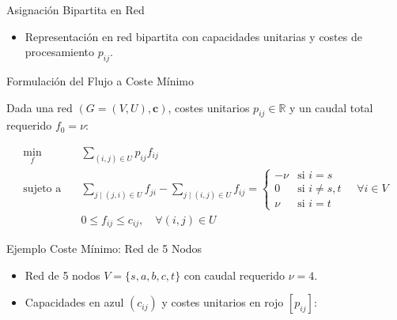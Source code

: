 \documentclass[
  ignorenonframetext,
]{beamer}
\providecommand{\tightlist}{%
  \setlength{\itemsep}{0pt}\setlength{\parskip}{0pt}}
\begin{document}
\begin{frame}{Asignación Bipartita en Red}
\label{asignaciuxf3n-bipartita-en-red}
\begin{itemize}
\tightlist
\item
  Representación en red bipartita con capacidades unitarias y costes de
  procesamiento \(p_{ij}\).
\end{itemize}
\end{frame}

\begin{frame}{Formulación del Flujo a Coste Mínimo}
\label{formulaciuxf3n-del-flujo-a-coste-muxednimo}
\begin{tcolorbox}[enhanced jigsaw, opacityback=0, breakable, title=\textcolor{quarto-callout-note-color}{\faInfo}\hspace{0.5em}{Modelo PL del Flujo a Coste Mínimo}, colback=white, colbacktitle=quarto-callout-note-color!10!white, bottomrule=.15mm, opacitybacktitle=0.6, coltitle=black, bottomtitle=1mm, leftrule=.75mm, colframe=quarto-callout-note-color-frame, toptitle=1mm, titlerule=0mm, rightrule=.15mm, left=2mm, arc=.35mm, toprule=.15mm]

Dada una red \((G = (V, U), \mathbf{c})\), costes unitarios
\(p_{ij} \in \mathbb{R}\) y un caudal total requerido \(f_0 = \nu\):

\[
\begin{aligned}
\min_{f} \quad & \sum_{(i,j) \in U} p_{ij} f_{ij} \\
\text{sujeto a} \quad & \sum_{j \mid (j, i) \in U} f_{ji} - \sum_{j \mid (i, j) \in U} f_{ij} = \begin{cases} -\nu & \text{si } i = s \\ 0 & \text{si } i \neq s, t \\ \nu & \text{si } i = t \end{cases} \quad \forall i \in V \\
& 0 \le f_{ij} \le c_{ij}, \quad \forall (i, j) \in U
\end{aligned}
\]

\end{tcolorbox}
\end{frame}

\begin{frame}{Ejemplo Coste Mínimo: Red de 5 Nodos}
\label{ejemplo-coste-muxednimo-red-de-5-nodos}
\begin{itemize}
\tightlist
\item
  Red de 5 nodos \(V = \{s, a, b, c, t\}\) con caudal requerido
  \(\nu = 4\).
\item
  Capacidades en azul \((c_{ij})\) y costes unitarios en rojo
  \([p_{ij}]\):
\end{itemize}
\end{frame}
\end{document}
